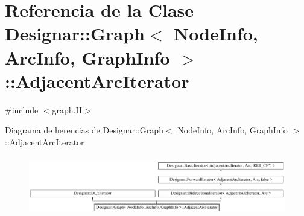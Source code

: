 \hypertarget{class_designar_1_1_graph_1_1_adjacent_arc_iterator}{}\section{Referencia de la Clase Designar\+:\+:Graph$<$ Node\+Info, Arc\+Info, Graph\+Info $>$\+:\+:Adjacent\+Arc\+Iterator}
\label{class_designar_1_1_graph_1_1_adjacent_arc_iterator}


{\ttfamily \#include $<$graph.\+H$>$}

Diagrama de herencias de Designar\+:\+:Graph$<$ Node\+Info, Arc\+Info, Graph\+Info $>$\+:\+:Adjacent\+Arc\+Iterator\begin{figure}[H]
\begin{center}
\leavevmode
\includegraphics[height=2.666667cm]{class_designar_1_1_graph_1_1_adjacent_arc_iterator}
\end{center}
\end{figure}
